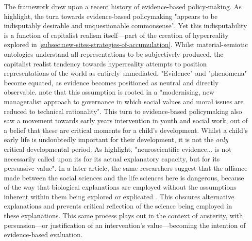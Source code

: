 The framework drew upon a recent history of evidence-based policy-making. As \citet[pp. 1–2]{edwards_early_2016} highlight, the turn towards evidence-based policymaking "appears to be indisputably desirable and unquestionable commonsense". Yet this indisputability is a function of capitalist realism itself—part of the creation of hyperreality explored in \ref{subsec:new-sites-strategies-of-accumulation}. Whilst material-semiotic ontologies understand all representations to be subjectively produced, the capitalist realist tendency towards hyperreality attempts to position representations of the world as entirely unmediated. "Evidence" and "phenomena" become equated, as evidence becomes positioned as neutral and directly observable. \citet[p. 1]{edwards_early_2016} note that this assumption is rooted in a "modernising, new manageralist approach to governance in which social values and moral issues are reduced to technical rationality". This turn to evidence-based policymaking also saw a movement towards early years intervention in youth and social work, out of a belief that these are critical moments for a child's development. Whilst a child's early life is undoubtedly important for their development, it is not the \emph{only} critical developmental period. As \citet[p. 8]{edwards_early_2016} highlight, "neuroscientific evidence... is not necessarily called upon its for its actual explanatory capacity, but for its persuasive value". In a later article, the same researchers suggest that the alliance made between the social sciences and the life sciences here is dangerous, because of the way that biological explanations are employed without the assumptions inherent within them being explored or explicated \citep{gillies_brave_2016}. This obscures alternative explanations and prevents critical reflection of the science being employed in these explanations. This same process plays out in the context of austerity, with persuasion—or justification of an intervention's value—becoming the intention of evidence-based evaluation. 

